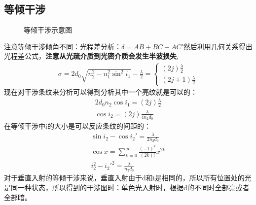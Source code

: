 \documentclass[UFT8]{article}
\begin{document}
\subsection{等倾干涉}
\begin{figure}[htbp]
\begin{center}
\end{center}
\caption{等倾干涉示意图}
\end{figure}

注意等倾干涉倾角不同：光程差分析：$\delta=AB+BC-AC'$然后利用几何关系得出光程差公式，\textbf{注意从光疏介质到光密介质会发生半波损失},
\begin{align*}
\sigma=2d_0\sqrt{n_{2}^{2}-n_{1}^{2}\sin^2 i_1}-\frac{\lambda}{2}=
\begin{cases}
(2j)\frac{\lambda}{2}\\
(2j+1)\frac{\lambda}{2}
\end{cases}
\end{align*}
现在对干涉条纹来分析可以得到分析其中一个亮纹就是可以的：
\begin{gather*}
2d_0n_2\cos i_1=(2j)\frac{\lambda}{2}\\
\cos i_2=(2j)\frac{\lambda}{4n_2 d_0}
\end{gather*}
在等倾干涉中i的大小是可以反应条纹的间距的：
\begin{gather*}
\sin i_2-\cos i_2'=\frac{\lambda}{2n_2d_0}\\
\cos x=\sum_{k=0}^{\infty}\frac{(-1)^k}{(2k)!}x^{2k}\\
i_{2}^{2}-i_{2}'^{2}=\frac{\lambda}{n_2 d_0}
\end{gather*}
对于垂直入射的等倾干涉来说，垂直入射由于d和i是相同的，所以所有位置处的光是同一种状态，所以得到的干涉图时：单色光入射时，根据d的不同时全部亮或者全部暗。
\end{document}
